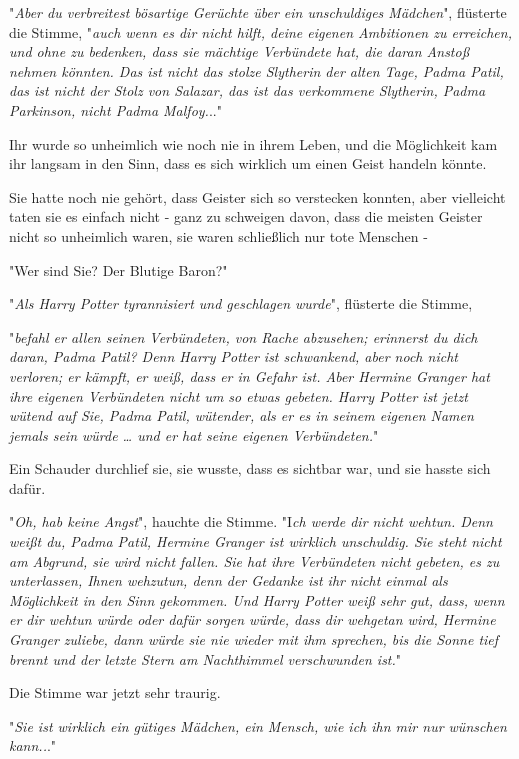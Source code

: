 {"\emph{Aber du verbreitest bösartige Gerüchte über ein unschuldiges Mädchen}", flüsterte die Stimme, "\emph{auch wenn es dir nicht hilft, deine eigenen Ambitionen zu erreichen, und ohne zu bedenken, dass sie mächtige Verbündete hat, die daran Anstoß nehmen könnten. Das ist nicht das stolze Slytherin der alten Tage, Padma Patil, das ist nicht der Stolz von Salazar, das ist das verkommene Slytherin, Padma Parkinson, nicht Padma Malfoy.}.."

Ihr wurde so unheimlich wie noch nie in ihrem Leben, und die Möglichkeit kam ihr langsam in den Sinn, dass es sich wirklich um einen Geist handeln könnte.

Sie hatte noch nie gehört, dass Geister sich so verstecken konnten, aber vielleicht taten sie es einfach nicht - ganz zu schweigen davon, dass die meisten Geister nicht so unheimlich waren, sie waren schließlich nur tote Menschen -

"Wer sind Sie? Der Blutige Baron?"

"\emph{Als Harry Potter tyrannisiert und geschlagen wurde}", flüsterte die Stimme,

"\emph{befahl er allen seinen Verbündeten, von Rache abzusehen; erinnerst du dich daran, Padma Patil? Denn Harry Potter ist schwankend, aber noch nicht verloren; er kämpft, er weiß, dass er in Gefahr ist. Aber Hermine Granger hat ihre eigenen Verbündeten nicht um so etwas gebeten. Harry Potter ist jetzt wütend auf Sie, Padma Patil, wütender, als er es in seinem eigenen Namen jemals sein würde … und er hat seine eigenen Verbündeten.}"

Ein Schauder durchlief sie, sie wusste, dass es sichtbar war, und sie hasste sich dafür.

"\emph{Oh, hab keine Angst}", hauchte die Stimme. "I\emph{ch werde dir nicht wehtun. Denn weißt du, Padma Patil, Hermine Granger ist wirklich unschuldig. Sie steht nicht am Abgrund, sie wird nicht fallen. Sie hat ihre Verbündeten nicht gebeten, es zu unterlassen, Ihnen wehzutun, denn der Gedanke ist ihr nicht einmal als Möglichkeit in den Sinn gekommen. Und Harry Potter weiß sehr gut, dass, wenn er dir wehtun würde oder dafür sorgen würde, dass dir wehgetan wird, Hermine Granger zuliebe, dann würde sie nie wieder mit ihm sprechen, bis die Sonne tief brennt und der letzte Stern am Nachthimmel verschwunden ist.}"

Die Stimme war jetzt sehr traurig.

"\emph{Sie ist wirklich ein gütiges Mädchen, ein Mensch, wie ich ihn mir nur wünschen kann..}."

}
